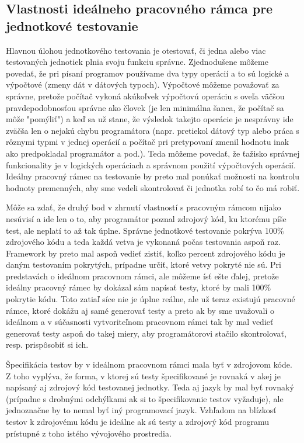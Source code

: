 \documentclass[11pt,twoside,slovak,a4paper]{article}
\begin{document}
	\subsection{Vlastnosti ideálneho pracovného rámca pre jednotkové testovanie}
	
		Hlavnou úlohou jednotkového testovania je otestovať, či jedna alebo viac testovaných jednotiek plnia svoju funkciu správne. Zjednodušene môžeme povedať, že pri písaní programov používame dva typy operácií a to sú logické a výpočtové (zmeny dát v dátových typoch). Výpočtové môžeme považovať za správne, pretože počítač vykoná akúkoľvek výpočtovú operáciu s oveľa väčšou pravdepodobnosťou správne ako človek (je len minimálna šanca, že počítač sa môže "pomýliť") a keď sa už stane, že výsledok takejto operácie je nesprávny ide zväčša len o nejakú chybu programátora (napr. pretiekol dátový typ alebo práca s rôznymi typmi v jednej operácií a počítač pri pretypovaní zmenil hodnotu inak ako predpokladal programátor a pod.). Teda môžeme povedať, že ťažisko správnej funkcionality je v logických operáciach a správnom použití výpočtových operácií. Ideálny pracovný rámec na testovanie by preto mal ponúkať možnosti na kontrolu hodnoty premenných, aby sme vedeli skontrolovať či jednotka robí to čo má robiť.
		
		Môže sa zdať, že druhý bod v zhrnutí vlastností s pracovným rámcom nijako nesúvisí a ide len o to, aby programátor poznal zdrojový kód, ku ktorému píše test, ale neplatí to až tak úplne. Správne jednotkové testovanie pokrýva 100\% zdrojového kódu a teda každá vetva je vykonaná počas testovania aspoň raz. Framework by preto mal aspoň vedieť zistiť, koľko percent zdrojového kódu je daným testovaním pokrytých, prípadne určiť, ktoré vetvy pokryté nie sú. Pri predstavách o ideálnom pracovnom rámci, ale môžeme ísť ešte ďalej, pretože ideálny pracovný rámec by dokázal sám napísať testy, ktoré by mali 100\% pokrytie kódu. Toto zatiaľ síce nie je úplne reálne, ale už teraz existujú pracovné rámce, ktoré dokážu aj samé generovať testy a preto ak by sme uvažovali o ideálnom a v súčasnosti vytvoriteľnom pracovnom rámci tak by mal vedieť generovať testy aspoň do takej miery, aby programátorovi stačilo skontrolovať, resp. prispôsobiť si ich.
		
		Špecifikácia testov by v ideálnom pracovnom rámci mala byť v zdrojovom kóde. Z toho vyplýva, že forma, v ktorej sú testy špecifikované je rovnaká v akej je napísaný aj zdrojový kód testovanej jednotky. Teda aj jazyk by mal byť rovnaký (prípadne s drobnými odchýlkami ak si to špecifikovanie testov vyžaduje), ale jednoznačne by to nemal byť iný programovací jazyk. Vzhľadom na blízkosť testov k zdrojovému kódu je ideálne ak sú testy a zdrojový kód programu prístupné z toho istého vývojového prostredia.
		
\end{document}
